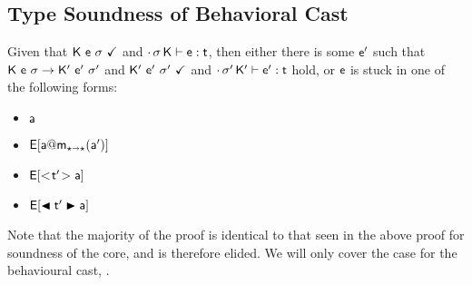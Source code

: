 \documentclass[acmlarge, anonymous, authordraft, review]{acmart} %
\begin{document}
%   
%   
%   
%   


\subsection*{Type Soundness of \kafka Behavioral Cast}

Given that $\WFp\K{\e~\s}$ and $\EnvType\cdot\s\K\e\t$, then either there is some $\ep$ 
such that $\Reduce \K\e\s \Kp\ep\sp$ and $\WFp\Kp{\ep~\sp}$ and $\EnvType\cdot\sp\Kp\ep\t$ hold, 
or $\e$ is stuck in one of the following forms:
\begin{itemize} 
\item $\a$
\item $\EE[\DynCall\a\m{\ap}]$
\item $\EE[\SubCast\tp\a]$
\item $\EE[\BehCast\tp\a]$
\end{itemize}

Note that the majority of the proof is identical to that seen in the above proof
for soundness of the \kafka core, and is therefore elided. We will only cover
the case for the \kafka behavioural cast, .
\end{document}
